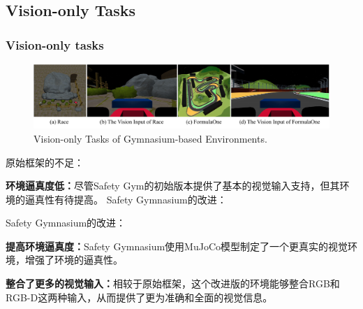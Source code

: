 \documentclass[10pt,mathserif]{beamer}%
\begin{document}
\subsection{Vision-only Tasks}
\begin{frame}[t,fragile]
    \frametitle{Vision-only tasks}
\begin{figure}[ht]
  \centering
  \includegraphics[width=0.9\linewidth]{Safety-Gymnasium/assets/main-paper/vision-task.pdf}
  \caption{Vision-only Tasks of Gymnasium-based Environments.}
  \label{pic:agent}
\end{figure}
\vspace{-0.5cm}
\begin{spacing}{1.2}
原始框架的不足：
\begin{itemize}
{
\fontsize{8pt}{9.6pt}\selectfont
   
    \item \textbf{环境逼真度低：}尽管Safety Gym的初始版本提供了基本的视觉输入支持，但其环境的逼真性有待提高。
Safety Gymnasium的改进：
}
\end{itemize}
Safety Gymnasium的改进：
\begin{itemize}
{
\fontsize{8pt}{9.6pt}\selectfont
   
       \item \textbf{提高环境逼真度：}Safety Gymnasium使用MuJoCo模型制定了一个更真实的视觉环境，增强了环境的逼真性。
    \item \textbf{整合了更多的视觉输入：}相较于原始框架，这个改进版的环境能够整合RGB和RGB-D这两种输入，从而提供了更为准确和全面的视觉信息。
}
\end{itemize}
\end{spacing}
\end{frame}
\end{document}
